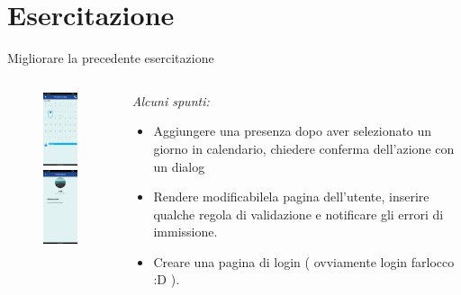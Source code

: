 \documentclass{../libs/presentation_format}
\begin{document}
\section{Esercitazione}
\begin{frame}{Migliorare la precedente esercitazione}
	\begin{minipage}[0.2\textheight]{\textwidth}
		\begin{columns}[T]
			\begin{column}{0.4\textwidth}
				\begin{figure}[htpb]
					\centering
					\includegraphics[width=2cm]{../libs/assignment-calendar}
					\includegraphics[width=2cm]{../libs/assignment-profile}
				\end{figure}
			\end{column}
			\begin{column}{0.6\textwidth}
				\emph{Alcuni spunti:}
				\begin{itemize}
					\item Aggiungere una presenza dopo aver selezionato un giorno in calendario, chiedere conferma dell'azione con un dialog
					\item Rendere modificabilela pagina dell'utente, inserire qualche regola di validazione e notificare gli errori di immissione.
					\item Creare una pagina di login ( ovviamente login farlocco :D ).
				\end{itemize}
			\end{column}
		\end{columns}
	\end{minipage}
\end{frame}
\end{document}

